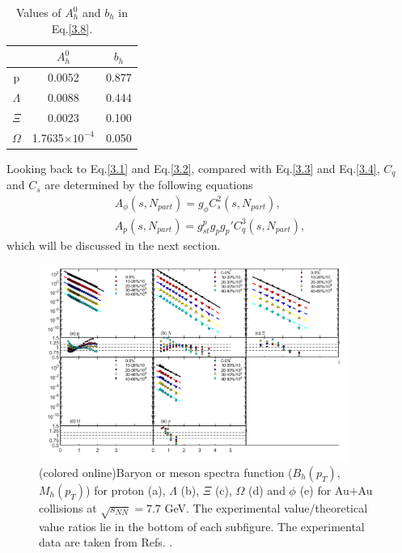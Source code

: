 \documentclass[twocolumn,aps,superscriptaddress,showpacs,nofootinbib,floatfix]{revtex4}
\begin{document}
\begin{table}
	\begin{tabular}{ccc}
		\hline
		\hline
		     & $A_h^0$ & $b_h$\\ 
		\hline
		p & 0.0052 & 0.877\\
		$\Lambda$ &0.0088 & 0.444\\
		$\Xi$ &0.0023 & 0.100\\
		$\Omega$ &1.7635$\times 10^{-4}$ & 0.050\\
		\hline
		\hline
	\end{tabular}
	\caption{Values of $A_h^0$ and $b_h$ in Eq.\ref{3.8}.} 
	\label{tab2}
\end{table} 

Looking back to Eq.\ref{3.1} and Eq.\ref{3.2}, compared with Eq.\ref{3.3} and Eq.\ref{3.4}, $C_q$ and $C_s$ are determined by the following equations
\begin{eqnarray}
	A_{\phi}(s,N_{part})=g_{\phi}C_s^2(s,N_{part}),\label{3.5}\\
	A_{p}(s,N_{part})=g_{st}^p g_p g_p' C_q^3(s,N_{part}),\label{3.6}
\end{eqnarray}
which will be discussed in the next section.
\begin{figure}[pht]
	\includegraphics[width=0.9\textwidth]{pic2.png}
	\caption{(colored online)Baryon or meson spectra function ($B_h(p_T)$, $M_h(p_T)$) for proton (a), $\Lambda$ (b), $\Xi$ (c), $\Omega$ (d) and $\phi$ (e) for Au+Au collisions at $\sqrt{s_{NN}}=7.7$ GeV. The experimental value/theoretical value ratios lie in the bottom of each subfigure. The experimental data are taken from Refs. \cite{STAR:2019bjj,STAR:2017sal,STAR:2015vvs}.}
	\label{fig2}
\end{figure}
\end{document}
